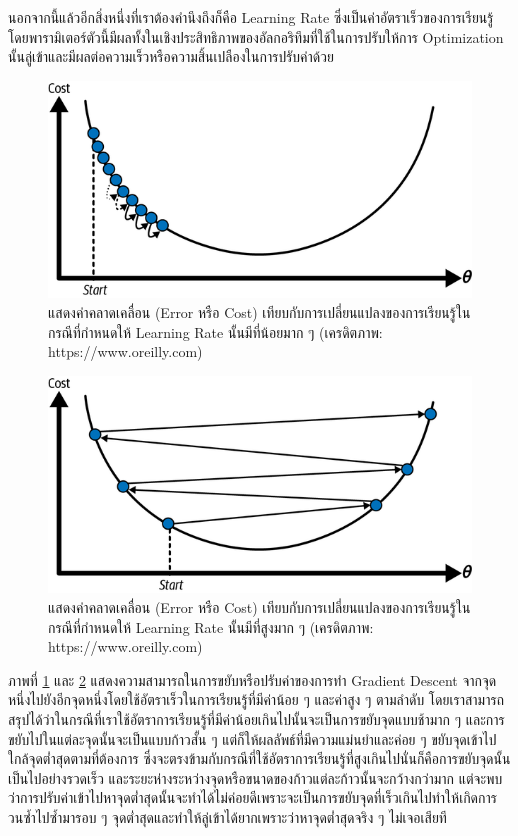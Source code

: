 นอกจากนี้แล้วอีกสิ่งหนึ่งที่เราต้องคำนึงถึงก็คือ Learning Rate ซึ่งเป็นค่าอัตราเร็วของการเรียนรู้ โดยพารามิเตอร์ตัวนี้มีผลทั้งในเชิงประสิทธิภาพของอัลกอริทึมที่ใช้ในการปรับให้การ Optimization นั้นลู่เข้าและมีผลต่อความเร็วหรือความสิ้นเปลืองในการปรับค่าด้วย

\begin{figure}[H]
    \centering
    \includegraphics[width=0.6\linewidth]{fig/learning_rate_small.png}
    \caption{แสดงค่าคลาดเคลื่อน (Error หรือ Cost) เทียบกับการเปลี่ยนแปลงของการเรียนรู้ในกรณีที่กำหนดให้ Learning Rate นั้นมีที่น้อยมาก ๆ (เครดิตภาพ: https://www.oreilly.com)}
    \label{fig:learning_rate_small}
\end{figure}

\begin{figure}[H]
    \centering
    \includegraphics[width=0.6\linewidth]{fig/learning_rate_high.png}
    \caption{แสดงค่าคลาดเคลื่อน (Error หรือ Cost) เทียบกับการเปลี่ยนแปลงของการเรียนรู้ในกรณีที่กำหนดให้ Learning Rate นั้นมีที่สูงมาก ๆ (เครดิตภาพ: https://www.oreilly.com)}
    \label{fig:learning_rate_high}
\end{figure}

ภาพที่ \ref{fig:learning_rate_small} และ \ref{fig:learning_rate_high} แสดงความสามารถในการขยับหรือปรับค่าของการทำ Gradient Descent จากจุดหนึ่งไปยังอีกจุดหนึ่งโดยใช้อัตราเร็วในการเรียนรู้ที่มีค่าน้อย ๆ และค่าสูง ๆ ตามลำดับ โดยเราสามารถสรุปได้ว่าในกรณีที่เราใช้อัตราการเรียนรู้ที่มีค่าน้อยเกินไปนั้นจะเป็นการขยับจุดแบบช้ามาก ๆ และการขยับไปในแต่ละจุดนั้นจะเป็นแบบก้าวสั้น ๆ แต่ก็ให้ผลลัพธ์ที่มีความแม่นยำและค่อย ๆ ขยับจุดเข้าไปใกล้จุดต่ำสุดตามที่ต้องการ ซึ่งจะตรงข้ามกับกรณีที่ใช้อัตราการเรียนรู้ที่สูงเกินไปนั่นก็คือการขยับจุดนั้นเป็นไปอย่างรวดเร็ว และระยะห่างระหว่างจุดหรือขนาดของก้าวแต่ละก้าวนั้นจะกว้างกว่ามาก แต่จะพบว่าการปรับค่าเข้าไปหาจุดต่ำสุดนั้นจะทำได้ไม่ค่อยดีเพราะจะเป็นการขยับจุดที่เร็วเกินไปทำให้เกิดการวนซ้ำไปซ้ำมารอบ ๆ จุดต่ำสุดและทำให้ลู่เข้าได้ยากเพราะว่าหาจุดต่ำสุดจริง ๆ ไม่เจอเสียที

